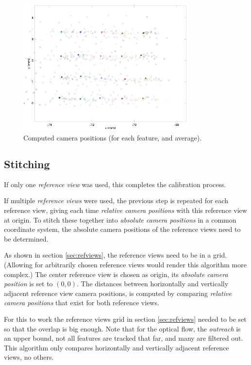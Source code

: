 \documentclass{scrreprt}
\begin{document}
\begin{figure}
\centering
\includegraphics[width=0.8\textwidth]{rcpos.png}
\caption{Computed camera positions (for each feature, and average).}
\label{fig:rcpositions}
\end{figure}



\subsection{Stitching}
If only one \emph{reference view} was used, this completes the calibration process.

If multiple \emph{reference views} were used, the previous step is repeated for each reference view, giving each time \emph{relative camera positions} with this reference view at origin. To stitch these together into \emph{absolute camera positions} in a common coordinate system, the absolute camera positions of the reference views need to be determined.

As shown in section \ref{sec:refviews}, the reference views need to be in a grid. (Allowing for arbitrarily chosen reference views would render this algorithm more complex.) The center reference view is chosen as origin, its \emph{absolute camera position} is set to $(0,0)$. The distances between horizontally and vertically adjacent reference view camera positions, is computed by comparing \emph{relative camera positions} that exist for both reference views.

For this to work the reference views grid in section \ref{sec:refviews} needed to be set so that the overlap is big enough. Note that for the optical flow, the \emph{outreach} is an upper bound, not all features are tracked that far, and many are filtered out. This algorithm only compares horizontally and vertically adjacent reference views, no others.
\end{document}
